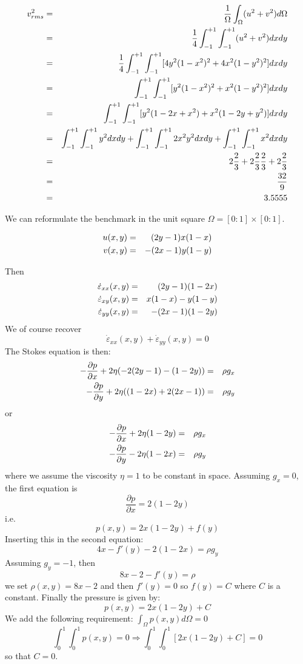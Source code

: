 \begin{eqnarray}
v_{rms}^2 
&=& \frac{1}{\Omega} \int_\Omega (u^2+v^2) d\Omega \nonumber\\
&=& \frac{1}{4} \int_{-1}^{+1}\int_{-1}^{+1} (u^2+v^2) dxdy \nonumber\\
&=& \frac{1}{4} \int_{-1}^{+1}\int_{-1}^{+1} [ 4y^2(1-x^2)^2 + 4x^2(1-y^2)^2   ] dxdy \nonumber\\
&=& \int_{-1}^{+1}\int_{-1}^{+1} [ y^2(1-x^2)^2 + x^2(1-y^2)^2   ] dxdy \nonumber\\
&=& \int_{-1}^{+1}\int_{-1}^{+1} [ y^2(1-2x+x^2) + x^2(1-2y+y^2)  ] dxdy \nonumber\\
&=& \int_{-1}^{+1}\int_{-1}^{+1} y^2 dxdy
+ \int_{-1}^{+1}\int_{-1}^{+1} 2 x^2 y^2 dxdy
+ \int_{-1}^{+1}\int_{-1}^{+1} x^2 dxdy\nonumber\\
&=& 2  \frac23 + 2 \frac23\frac23 + 2 \frac23 \nonumber\\
&=& \frac{32}{9} \nonumber\\
&=& 3.5555
\end{eqnarray}

We can reformulate the benchmark in the unit square $\Omega=[0:1]\times[0:1]$.

\begin{eqnarray}
u(x,y) &=&  (2y-1)x(1-x) \nonumber\\
v(x,y) &=& - (2x-1)y(1-y) \nonumber
\end{eqnarray}

Then 
\begin{eqnarray}
\dot\varepsilon_{xx}(x,y) &=& (2y-1)(1-2x) \nonumber\\
\dot\varepsilon_{xy}(x,y) &=&  x(1-x)  - y(1-y)  \nonumber\\
\dot\varepsilon_{yy}(x,y) &=& - (2x-1)(1-2y)  \nonumber
\end{eqnarray}
We of course recover 
\[
\dot\varepsilon_{xx}(x,y) + \dot\varepsilon_{yy}(x,y) = 0
\]
The Stokes equation is then:
\begin{eqnarray}
-\frac{\partial p}{\partial x} + 2\eta (-2(2y-1)-(1-2y)  ) &=& \rho g_x \nonumber\\
-\frac{\partial p}{\partial y} + 2\eta ((1-2x)+2(2x-1)  ) &=& \rho g_y \nonumber
\end{eqnarray}
or
\begin{eqnarray}
-\frac{\partial p}{\partial x} + 2\eta (1-2y) &=& \rho g_x \nonumber\\
-\frac{\partial p}{\partial y} - 2\eta (1-2x) &=& \rho g_y \nonumber
\end{eqnarray}
where we assume the viscosity $\eta=1$ to be constant in space.
Assuming $g_x=0$, the first equation is
\[
\frac{\partial p}{\partial x} =  2 (1-2y)
\]
i.e.
\[
p(x,y) = 2 x (1-2y) + f(y)
\]
Inserting this in the second equation:
\[
4 x - f'(y) - 2 (1-2x)   = \rho g_y
\]
Assuming $g_y=-1$, then
\[
8 x -2  - f'(y)  = \rho 
\]
we set $\rho(x,y)= 8x-2$ and then $f'(y)=0$ so $f(y)=C$ where $C$
is a constant.
Finally the pressure is given by:
\[
p(x,y)= 2 x (1-2y) + C
\]
We add the following requirement: $\int_\Omega p(x,y) d\Omega =0$ 
\[
\int_{0}^1 \int _0^1 p(x,y) = 0
\Rightarrow 
\int_{0}^1 \int _0^1 [ 2 x (1-2y) + C] = 0
\]
so that $C=0$.

